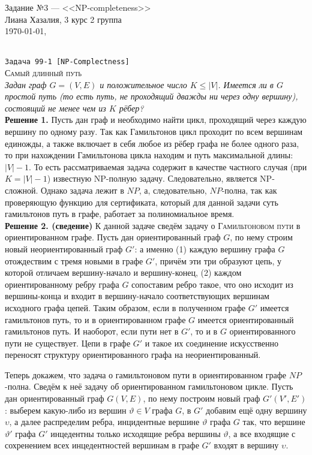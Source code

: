 \documentclass[10pt]{article}
\begin{document}
\def\chap#1#2{\ \\ {\large\bf#1 \ | \ \tt\scshape#2} \par}

{\bf
\begin{flushright}
\small{Задание №3 --- <<NP-completeness>> \\ Лиана Хазалия, 3 курс 2 группа\\  \today, \currenttime}
\end{flushright}}
\ \\
\rm
{\large\texttt{Задача 99-1 [NP-Complectness]}}
\\
\textsc{Самый длинный путь}
\ \\[0.2cm]
\textit{Задан граф $G=(V,E)$ и положительное число $K\leq |V|$. Имеется ли в $G$ простой путь (то есть путь, не проходящий дважды ни через одну вершину), состоящий не менее чем из $K$ рёбер?}
\ \\[0.2cm]
\textbf{Решение 1.}  Пусть дан граф и необходимо найти цикл, проходящий через каждую вершину по одному разу. Так как Гамильтонов цикл проходит по всем вершинам единожды, а также включает в себя любое из рёбер графа не более одного раза, то при нахождении Гамильтонова цикла находим и путь максимальной длины: $|V|-1$. То есть рассматриваемая задача содержит в качестве частного случая (при $K=|V|-1$) известную NP-полную задачу. Следовательно, является NP-сложной. Однако задача лежит в $NP$, а, следовательно, $NP$-полна, так как проверяющую функцию для сертификата, который для данной задачи суть гамильтонов путь в графе, работает за полиномиальное время.
\ \\[0.2cm]
\textbf{Решение 2. (сведение)}  
 К данной задаче сведём задачу о \textsc{Гамильтоновом пути} в ориентированном графе. Пусть дан ориентированный граф $G$, по нему строим новый неориентированный граф $G'$: а именно (1) каждую вершину графа $G$ отождествим с тремя новыми в графе $G'$, причём эти три образуют цепь, у которой отличаем вершину-начало и вершину-конец, (2) каждом ориентированному ребру графа $G$ сопоставим ребро такое, что оно исходит из вершины-конца и входит в вершину-начало соответствующих вершинам исходного графа цепей. Таким образом, если в полученном графе $G'$ имеется гамильтонов путь, то и в ориентированном графе $G$ имеется ориентированный гамильтонов путь. И наоборот, если пути нет в $G'$, то и в $G$ ориентированного пути не существует. Цепи в графе $G'$ и такое их соединение искусственно переносят структуру ориентированного графа на неориентированный.
\medskip\par
Теперь докажем, что задача о гамильтоновом пути в ориентированном графе $NP$-полна. Сведём к неё задачу об ориентированном гамильтоновом цикле. Пусть дан ориентированный граф $G(V, E)$, по нему построим новый граф $G'(V', E')$: выберем какую-либо из вершин $\vartheta \in V$ графа $G$, в $G'$ добавим ещё одну вершину $\upsilon$, а далее распределим ребра, инцидентные вершине $\vartheta$ графа $G$ так, что вершине $\vartheta'$ графа $G'$ инцедентны только исходящие ребра вершины $\vartheta$, а все входящие с сохренением всех инцедентностей вершинам в графе $G'$ входят в вершину $\upsilon$.
\end{document}
